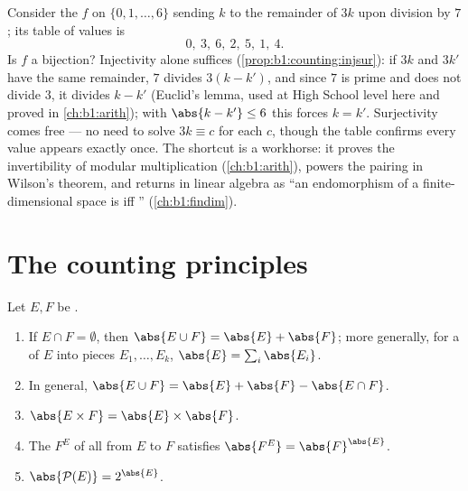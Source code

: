 \begin{example}\label{ex:b1:counting:mod7}
Consider the  $f$ on $\{0, 1, \dots, 6\}$ sending $k$ to the
remainder of $3k$ upon division by $7$; its table of values is
\[
0,\ 3,\ 6,\ 2,\ 5,\ 1,\ 4 .
\]
Is $f$ a bijection? Injectivity alone suffices
(\cref{prop:b1:counting:injsur}): if $3k$ and $3k'$ have the same
remainder, $7$ divides $3(k - k')$, and since $7$ is prime and
does not divide $3$, it divides $k - k'$ (Euclid's lemma, used at
High School level here and proved in \cref{ch:b1:arith}); with
$\abs{k - k'} \leq 6$ this forces $k = k'$. Surjectivity comes
free --- no need to solve $3k \equiv c$ for each $c$, though the
table confirms every value appears exactly once. The shortcut is
a workhorse: it proves the invertibility of modular
multiplication (\cref{ch:b1:arith}), powers the pairing in
Wilson's theorem, and returns in linear algebra as ``an
endomorphism of a finite-dimensional space is  iff
'' (\cref{ch:b1:findim}).
\end{example}

\section{The counting principles}

\begin{proposition}\label{prop:b1:counting:rules}
Let $E, F$ be .
\begin{enumerate}
  \item If $E \cap F = \emptyset$, then $\abs{E \cup F} = \abs{E} +
        \abs{F}$; more generally, for a  of $E$ into pieces
        $E_1, \dots, E_k$, $\abs{E} = \sum_i \abs{E_i}$.
  \item In general, $\abs{E \cup F} = \abs{E} + \abs{F} - \abs{E \cap
        F}$.
  \item $\abs{E \times F} = \abs{E} \times \abs{F}$.
  \item The  $F^E$ of all  from $E$ to $F$ satisfies
        $\abs{F^E} = \abs{F}^{\abs{E}}$.
  \item $\abs{\mathcal{P}(E)} = 2^{\abs{E}}$.
\end{enumerate}
\end{proposition}

